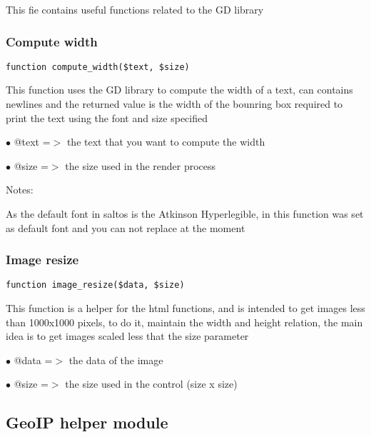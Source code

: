 \documentclass[a4paper]{article}
\begin{document}
This fie contains useful functions related to the GD library

\hypertarget{toc454}{}
\subsubsection{Compute width}

\begin{lstlisting}
function compute_width($text, $size)
\end{lstlisting}

This function uses the GD library to compute the width of a text,
can contains newlines and the returned value is the width of the
bounring box required to print the text using the font and size
specified

\begin{compactitem}
\item[\color{myblue}$\bullet$] @text =$>$ the text that you want to compute the width
\item[\color{myblue}$\bullet$] @size =$>$ the size used in the render process
\end{compactitem}

Notes:

As the default font in saltos is the Atkinson Hyperlegible, in this
function was set as default font and you can not replace at the
moment

\hypertarget{toc455}{}
\subsubsection{Image resize}

\begin{lstlisting}
function image_resize($data, $size)
\end{lstlisting}

This function is a helper for the html functions, and is intended to
get images less than 1000x1000 pixels, to do it, maintain the width and
height relation, the main idea is to get images scaled less that the size
parameter

\begin{compactitem}
\item[\color{myblue}$\bullet$] @data =$>$ the data of the image
\item[\color{myblue}$\bullet$] @size =$>$ the size used in the control (size x size)
\end{compactitem}

\hypertarget{toc456}{}
\subsection{GeoIP helper module}
\end{document}
